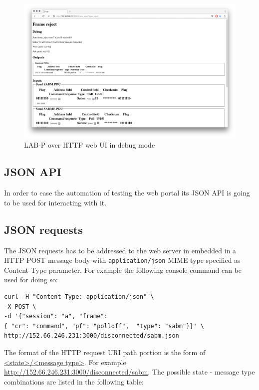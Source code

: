 \documentclass[a4paper]{article}
\begin{document}
\begin{figure}[!htb]
  \centering
  \includegraphics[width=\textwidth]{figures/web2.png}
  \caption{LAB-P over HTTP web UI in debug mode}
  \label{fig:web2}
\end{figure}

\subsection{JSON API}
In order to ease the automation of testing the web portal its JSON API is going to be used for interacting with it.

\subsection{JSON requests}\label{sec:json_req}

The JSON requests has to be addressed to the web server in embedded in a HTTP POST message body with \verb!application/json! MIME type specified as Content-Type parameter. For example the following console command can be used for doing so:

\begin{verbatim}
curl -H "Content-Type: application/json" \
-X POST \
-d '{"session": "a", "frame": 
{ "cr": "command", "pf": "polloff",  "type": "sabm"}}' \
http://152.66.246.231:3000/disconnected/sabm.json
\end{verbatim}

The format of the HTTP request URI path portion is the form of \url{<state>/<message type>}. For example \url{http://152.66.246.231:3000/disconnected/sabm}. The possible state - message type combinations are listed in the following table:
\end{document}
